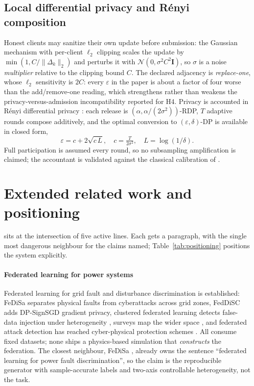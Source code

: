 \documentclass[review,12pt]{elsarticle}
\begin{document}
\subsection{Local differential privacy and R\'enyi composition}
\label{sec:sup-dp}

Honest clients may sanitize their own update before submission: the
Gaussian mechanism with per-client $\ell_2$ clipping \cite{abadi2016}
scales the update by $\min(1, C/\lVert\Delta_k\rVert_2)$ and perturbs it
with $\mathcal{N}(0,\sigma^2 C^2 \mathbf{I})$, so $\sigma$ is a noise
\emph{multiplier} relative to the clipping bound $C$. The declared
adjacency is \emph{replace-one}, whose $\ell_2$ sensitivity is $2C$:
every $\varepsilon$ in the paper is about a factor of four worse than the
add/remove-one reading, which strengthens rather than weakens the
privacy-versus-admission incompatibility reported for H4. Privacy is
accounted in R\'enyi differential privacy \cite{mironov2017}: each
release is $(\alpha, \alpha/(2\sigma^2))$-RDP, $T$ adaptive rounds
compose additively, and the optimal conversion to
$(\varepsilon,\delta)$-DP is available in closed form,
\begin{equation}
\varepsilon = c + 2\sqrt{c\,L},
\quad c = \tfrac{T}{2\sigma^2},
\quad L = \log(1/\delta).
\label{eq:epsilon}
\end{equation}
Full participation is assumed every round, so no subsampling
amplification is claimed; the accountant is validated against the
classical calibration of \cite{dwork2014}.

\section{Extended related work and positioning}
\label{sec:sup-related}

\sysname{} sits at the intersection of five active lines. Each gets a
paragraph, with the single most dangerous neighbour for the claims named;
Table~\ref{tab:positioning} positions the system explicitly.

\paragraph{Federated learning for power systems}
Federated learning for grid fault and disturbance discrimination is
established: FeDiSa \cite{husnoo2023fedisa} separates physical faults
from cyberattacks across grid zones, FedDiSC \cite{husnoo2023feddisc}
adds DP-SignSGD gradient privacy, clustered federated learning detects
false-data injection under heterogeneity \cite{li2025fdia}, surveys map
the wider space \cite{fl4sg2024}, and federated attack detection has
reached cyber-physical protection schemes \cite{du2025protection}. All
consume fixed datasets; none ships a physics-based simulation that
\emph{constructs} the federation. The closest neighbour, FeDiSa
\cite{husnoo2023fedisa}, already owns the sentence ``federated learning
for power fault discrimination'', so the claim is the reproducible
generator with sample-accurate labels and two-axis controllable
heterogeneity, not the task.
\end{document}
